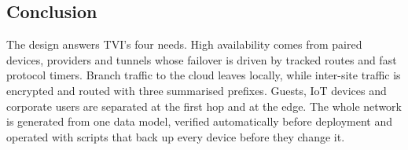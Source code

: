 \subsection{Conclusion}
The design answers TVI's four needs. High availability comes from paired devices, providers and tunnels
whose failover is driven by tracked routes and fast protocol timers. Branch traffic to the cloud leaves
locally, while inter-site traffic is encrypted and routed with three summarised prefixes. Guests, IoT devices
and corporate users are separated at the first hop and at the edge. The whole network is generated from one
data model, verified automatically before deployment and operated with scripts that back up every device
before they change it.

